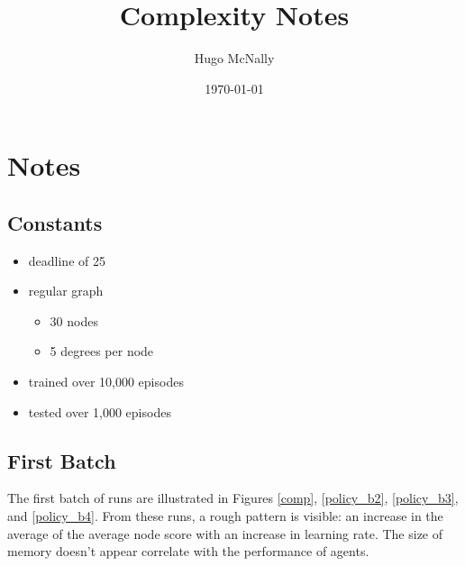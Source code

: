 \documentclass[a4paper]{article}
\title{Complexity Notes}
\date{\today}
\author{Hugo McNally}
\begin{document}
\section*{Notes}

\subsection*{Constants}
\begin{itemize}
    \item deadline of 25
    \item regular graph
    \begin{itemize}
        \item 30 nodes
        \item 5 degrees per node
    \end{itemize}
    \item trained over 10,000 episodes
    \item tested over 1,000 episodes
\end{itemize}

\subsection*{First Batch}

The first batch of runs are illustrated in Figures \ref{comp},
\ref{policy_b2},
\ref{policy_b3},
and
\ref{policy_b4}.
From these runs,
a rough pattern is visible:
an increase in the average of the average node score
with an increase in learning rate.
The size of memory doesn't appear correlate with the performance of agents.
\end{document}
